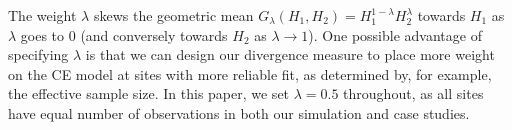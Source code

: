 \documentclass[12pt]{article}
\newcommand{\JSGa}{\mathop{\mathrm{JS}^{\mathrm{G}_{\lambda}}}\nolimits}
\begin{document}
The weight $\lambda$ skews the geometric mean $G_{\lambda}(H_1,H_2) = H_1^{1-\lambda}H_{2}^{\lambda}$ towards $H_1$ as $\lambda$ goes to 0 (and conversely towards $H_2$ as $\lambda \rightarrow 1$). 
One possible advantage of specifying $\lambda$ is that we can design our divergence measure to place more weight on the CE model at sites with more reliable fit, as determined by, for example, the effective sample size.
In this paper, we set $\lambda = 0.5$ throughout, as all sites have equal number of observations in both our simulation and case studies.
\end{document}
